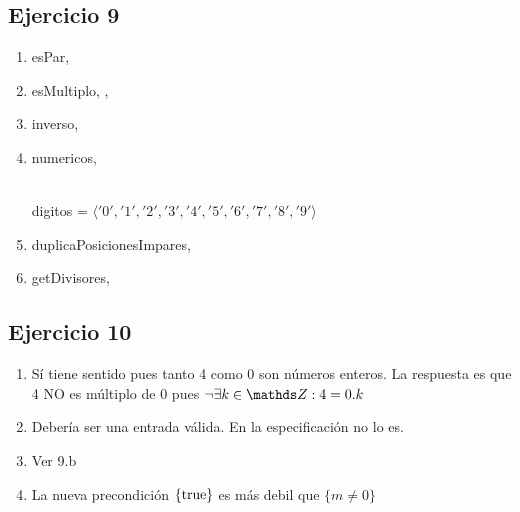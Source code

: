 \subsection{Ejercicio 9}
\begin{enumerate}[label=(\alph*)]
    \item   \begin{proc}{esPar}{, }{}
    \end{proc}
    \item   \begin{proc}{esMultiplo}{, , }{}
    \end{proc}
    \item   \begin{proc}{inverso}{, }{}
    \end{proc}
    \item   \begin{proc}{numericos}{, }{}
    \end{proc}\\
    digitos = $\langle '0', '1', '2', '3', '4', '5', '6', '7', '8', '9' \rangle$
    \item   \begin{proc}{duplicaPosicionesImpares}{, }{}
    \end{proc}
    \item   \begin{proc}{getDivisores}{, }{}
    \end{proc}
\end{enumerate}

\subsection{Ejercicio 10}
\begin{enumerate}[label=(\alph*)]
    \item Sí tiene sentido pues tanto 4 como 0 son números enteros. La respuesta es que 4 NO es múltiplo de 0 pues
    $ \neg \exists k \in \ent : 4 = 0.k$
    \item Debería ser una entrada válida. En la especificación no lo es.
    \item Ver 9.b
    \item La nueva precondición $\{\mathrm{true}\}$ es más debil que $\{ m \neq 0\}$
\end{enumerate}

